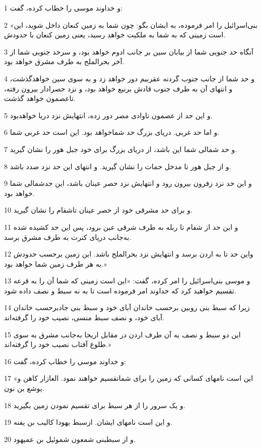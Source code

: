 \par 1 و خداوند موسی را خطاب کرده، گفت:
\par 2 «بنی‌اسرائیل را امر فرموده، به ایشان بگو: چون شما به زمین کنعان داخل شوید، این است زمینی که به شما به ملکیت خواهد رسید، یعنی زمین کنعان با حدودش.
\par 3 آنگاه حد جنوبی شما از بیابان سین بر جانب ادوم خواهد بود، و سرحد جنوبی شما از آخر بحرالملح به طرف مشرق خواهد بود.
\par 4 و حد شما از جانب جنوب گردنه عقربیم دور خواهد زد و به سوی سین خواهدگذشت، و انتهای آن به طرف جنوب قادش برنیع خواهد بود، و نزد حصرادار بیرون رفته، تاعصمون خواهد گذشت.
\par 5 و این حد از عصمون تاوادی مصر دور زده، انتهایش نزد دریا خواهدبود.
\par 6 و اما حد غربی. دریای بزرگ حد شماخواهد بود. این است حد غربی شما.
\par 7 و حد شمالی شما این باشد، از دریای بزرگ برای خود جبل هور را نشان گیرید.
\par 8 و از جبل هور تا مدخل حمات را نشان گیرید. و انتهای این حد نزد صدد باشد.
\par 9 و این حد نزد زفرون بیرون رود و انتهایش نزد حصر عینان باشد، این حدشمالی شما خواهد بود.
\par 10 و برای حد مشرقی خود از حصر عینان تاشفام را نشان گیرید.
\par 11 و این حد از شفام تا ربله به طرف شرقی عین برود، پس این حد کشیده شده به‌جانب دریای کنرت به طرف مشرق برسد.
\par 12 واین حد تا به اردن برسد و انتهایش نزد بحرالملح باشد. این زمین برحسب حدودش به هر طرف زمین شما خواهد بود.»
\par 13 و موسی بنی‌اسرائیل را امر کرده، گفت: «این است زمینی که شما آن را به قرعه تقسیم خواهید کرد که خداوند امر فرموده است تا به نه سبط و نصف داده شود.
\par 14 زیرا که سبط بنی روبین برحسب خاندان آبای خود و سبط بنی جادبرحسب خاندان آبای خود، و نصف سبط منسی، نصیب خود را گرفته‌اند.
\par 15 این دو سبط و نصف به آن طرف اردن در مقابل اریحا به‌جانب مشرق به سوی طلوع آفتاب نصیب خود را گرفته‌اند.»
\par 16 و خداوند موسی را خطاب کرده، گفت:
\par 17 «این است نامهای کسانی که زمین را برای شماتقسیم خواهند نمود. العازار کاهن و یوشع بن نون.
\par 18 و یک سرور را از هر سبط برای تقسیم نمودن زمین بگیرید.
\par 19 و این است نامهای ایشان. ازسبط یهودا کالیب بن یفنه.
\par 20 و از سبطبنی شمعون شموئیل بن عمیهود.
